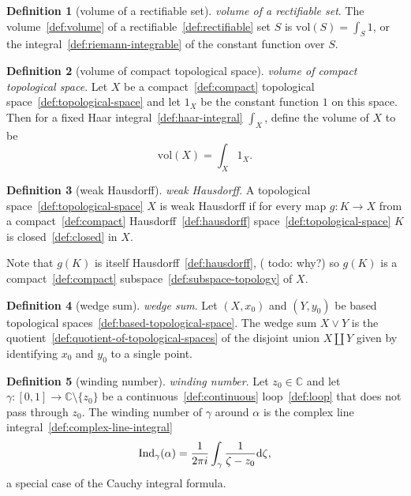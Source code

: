 \documentclass[12pt,a4paper]{article}
\theoremstyle{definition}
\newtheorem{definition}{Definition}
\begin{document}
\begin{definition}[volume of a rectifiable set]\label{def:volume-of-a-rectifiable-set}
\emph{volume of a rectifiable set}. The volume~\ref{def:volume} of a rectifiable~\ref{def:rectifiable} set $S$ is $\text{vol}(S) = \int_S 1$, or the integral~\ref{def:riemann-integrable} of the constant function over $S$.
\end{definition}

\begin{definition}[volume of compact topological space]\label{def:volume-of-compact-topological-space}
\emph{volume of compact topological space}. Let $X$ be a compact~\ref{def:compact} topological space~\ref{def:topological-space} and let $1_X$ be the constant function $1$ on this space. Then for a fixed Haar integral~\ref{def:haar-integral} $\int_X$, define the volume of $X$ to be $$\text{vol}(X) = \int_X 1_X.$$
\end{definition}

\begin{definition}[weak Hausdorff]\label{def:weak-hausdorff}
\emph{weak Hausdorff}. A topological space~\ref{def:topological-space} $X$ is weak Hausdorff if for every map $g:K\to X$ from a compact~\ref{def:compact} Hausdorff~\ref{def:hausdorff} space~\ref{def:topological-space} $K$ is closed~\ref{def:closed} in $X$. 

Note that $g(K)$ is itself Hausdorff~\ref{def:hausdorff}, ( todo: why?) so $g(K)$ is a compact~\ref{def:compact} subspace~\ref{def:subspace-topology} of $X$.
\end{definition}

\begin{definition}[wedge sum]\label{def:wedge-sum}
\emph{wedge sum}. Let $(X,x_0)$ and $(Y,y_0)$ be based topological spaces~\ref{def:based-topological-space}. The wedge sum $X\vee Y$ is the quotient~\ref{def:quotient-of-topological-spaces} of the disjoint union $X\amalg Y$ given by identifying $x_0$ and $y_0$ to a single point.
\end{definition}

\begin{definition}[winding number]\label{def:winding-number}
\emph{winding number}. Let $z_0\in \mathbb C$ and let $\gamma:[0,1]\to \mathbb C\setminus \{z_0\}$ be a continuous~\ref{def:continuous} loop~\ref{def:loop} that does not pass through $z_0$. The winding number of $\gamma$ around $\alpha$ is the complex line integral~\ref{def:complex-line-integral} $$\text{Ind}_\gamma(\alpha) = \frac{1}{2\pi i}\int_\gamma \frac{1}{\zeta - z_0} \text d\zeta,$$
a special case of the Cauchy integral formula.
\end{definition}
\end{document}
